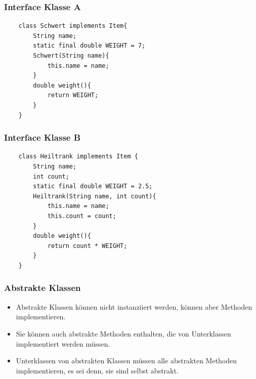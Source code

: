 \begin{frame}[fragile]
\frametitle{Interface Klasse A}
\begin{lstlisting}
    class Schwert implements Item{
        String name;
        static final double WEIGHT = 7;
        Schwert(String name){
            this.name = name;
        }
        double weight(){
            return WEIGHT;
        }
    }
\end{lstlisting}
\end{frame}

\begin{frame}[fragile]
\frametitle{Interface Klasse B}
\begin{lstlisting}
    class Heiltrank implements Item {
        String name;
        int count;
        static final double WEIGHT = 2.5;
        Heiltrank(String name, int count){
            this.name = name;
            this.count = count;
        }
        double weight(){
            return count * WEIGHT;
        }
    }
\end{lstlisting}
\end{frame}

\begin{frame}[fragile]
\frametitle{Abstrakte Klassen}
\begin{itemize}
    \item Abstrakte Klassen können nicht instanziiert werden, können aber Methoden implementieren. 
    \item Sie können auch abstrakte Methoden enthalten, die von Unterklassen implementiert werden müssen.
    \item Unterklassen von abstrakten Klassen müssen alle abstrakten Methoden implementieren, es sei denn, sie sind selbst abstrakt.
\end{itemize}
\end{frame}